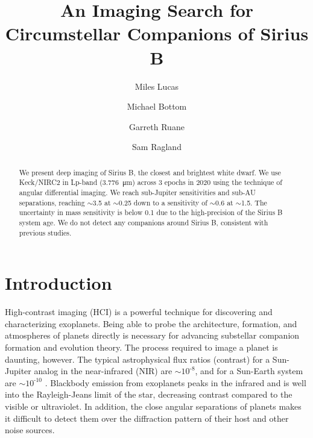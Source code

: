 \documentclass[twocolumn]{aastex631}
\begin{document}
\title{An Imaging Search for Circumstellar Companions of Sirius B}



\author[0000-0001-6341-310X]{Miles Lucas}

\author[0000-0003-1341-5531]{Michael Bottom}

\author[0000-0003-4769-1665]{Garreth Ruane}

\author[0000-0002-0696-1780]{Sam Ragland}


\begin{abstract}
We present deep imaging of Sirius B, the closest and brightest white dwarf. We use Keck/NIRC2 in Lp-band (\qty{3.776}{\micro\meter}) across 3 epochs in 2020 using the technique of angular differential imaging. We reach sub-Jupiter sensitivities and sub-AU separations, reaching $\sim$\qty{3.5}{\jupitermass} at $\sim$\qty{0.25}{\au} down to a sensitivity of $\sim$\qty{0.6}{\jupitermass} at $\sim$\qty{1.5}{\au}. The uncertainty in mass sensitivity is below \qty{0.1}{\jupitermass} due to the high-precision of the Sirius B system age. We do not detect any companions around Sirius B, consistent with previous studies.
\end{abstract}

\section{Introduction} \label{sec:intro}

High-contrast imaging (HCI) is a powerful technique for discovering and characterizing exoplanets. Being able to probe the architecture, formation, and atmospheres of planets directly is necessary for advancing substellar companion formation and evolution theory. The process required to image a planet is daunting, however. The typical astrophysical flux ratios (contrast) for a Sun-Jupiter analog in the near-infrared (NIR) are $\sim$$10^{\text{-}8}$, and for a Sun-Earth system are $\sim$$10^{\text{-}10}$ \citep{traub_direct_2010}. Blackbody emission from exoplanets peaks in the infrared and is well into the Rayleigh-Jeans limit of the star, decreasing contrast compared to the visible or ultraviolet. In addition, the close angular separations of planets makes it difficult to detect them over the diffraction pattern of their host and other noise sources.
\end{document}
